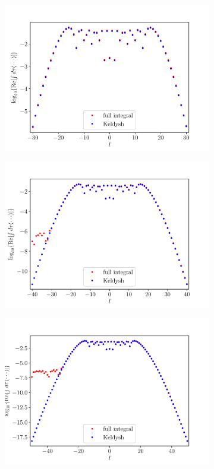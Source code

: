\begin{figure}
\begin{subfigure}[b]{0.33\linewidth}
  \includegraphics[width=\textwidth]{figures/ch_ATI_SFA/He/l30n512WP20PG15MR35vsKeldysh.pdf}
\end{subfigure}
\begin{subfigure}[b]{0.33\linewidth}
  \includegraphics[width=\textwidth]{figures/ch_ATI_SFA/He/l40n512WP40PG25MR35vsKeldysh.pdf}
\end{subfigure}
\begin{subfigure}[b]{0.33\linewidth}
  \includegraphics[width=\textwidth]{figures/ch_ATI_SFA/He/l50n512WP40PG25MR35vsKeldysh.pdf}

\end{subfigure}
\end{figure}
